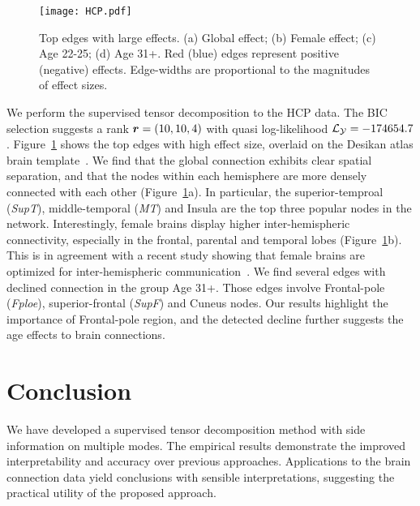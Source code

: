 \documentclass{article}
\theoremstyle{definition}
\theoremstyle{definition}
\begin{document}
\begin{figure}[!h]
\centering
\texttt{[image: HCP.pdf]}
\vspace{-.5cm}
\caption{\small Top edges with large effects. (a) Global effect; (b) Female effect; (c) Age 22-25; (d) Age 31+. Red (blue) edges represent positive (negative) effects. Edge-widths are proportional to the magnitudes of effect sizes.
}\label{fig:brain}
\vspace{-.2cm}
\end{figure}


We perform the supervised tensor decomposition to the HCP data. The BIC selection suggests a rank $\bm{r}=(10,10,4)$ with quasi log-likelihood $\mathcal{L}_{\mathcal{Y}}=-174654.7$. Figure~\ref{fig:brain} shows the top edges with high effect size, overlaid on the Desikan atlas brain template~\citep{desikan2006automated}. We find that the global connection exhibits clear spatial separation, and that the nodes within each hemisphere are more densely connected with each other (Figure~\ref{fig:brain}a). In particular, the superior-temproal (\emph{SupT}), middle-temporal (\emph{MT}) and Insula are the top three popular nodes in the network. Interestingly, female brains display higher inter-hemispheric connectivity, especially in the frontal, parental and temporal lobes (Figure~\ref{fig:brain}b). This is in agreement with a recent study showing that female brains are optimized for inter-hemispheric communication~\citep{ingalhalikar2014sex}. We find several edges with declined connection in the group Age 31+. Those edges involve Frontal-pole (\emph{Fploe}), superior-frontal (\emph{SupF}) and Cuneus nodes. Our results highlight the importance of Frontal-pole region, and the detected decline further suggests the age effects to brain connections. 

\section{Conclusion}
\vspace{-.2cm}
We have developed a supervised tensor decomposition method with side information on multiple modes. The empirical results demonstrate the improved interpretability and accuracy over previous approaches. Applications to the brain connection data yield conclusions with sensible interpretations, suggesting the practical utility of the proposed approach.
\end{document}
